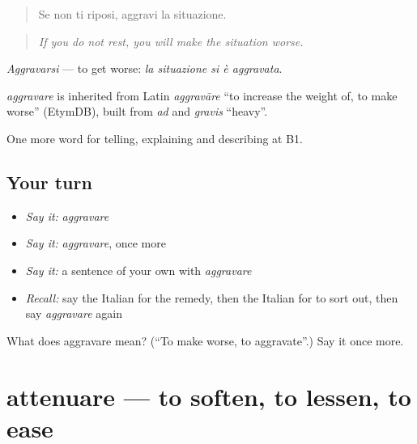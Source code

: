 \begin{quote}
Se non ti riposi, aggravi la situazione.
\end{quote}

\begin{quote}
\emph{If you do not rest, you will make the situation worse.}
\end{quote}

\emph{Aggravarsi} — to get worse: \emph{la situazione si è aggravata}.

\begin{cousinweb}
\emph{aggravare} is inherited from Latin \emph{aggravāre} \textquotedblleft{}to increase the weight of, to make worse\textquotedblright{} (EtymDB), built from \emph{ad} and \emph{gravis} \textquotedblleft{}heavy\textquotedblright{}.
\end{cousinweb}

\begin{grammarlens}[title={What you've built}]
One more word for telling, explaining and describing at B1.
\end{grammarlens}

\subsection*{Your turn}
\begin{itemize}
\raggedright
  \item \emph{Say it:} \emph{aggravare}
  \item \emph{Say it:} \emph{aggravare}, once more
  \item \emph{Say it:} a sentence of your own with \emph{aggravare}
  \item \emph{Recall:} say the Italian for the remedy, then the Italian for to sort out, then say \emph{aggravare} again
\end{itemize}

\begin{tcolorbox}[breakable,colback=teal!4,colframe=teal!35!black,title={Before you move on}]
What does aggravare mean? (\textquotedblleft{}To make worse, to aggravate\textquotedblright{}.) Say it once more.
\end{tcolorbox}
\section[attenuare]{attenuare — to soften, to lessen, to ease}

\label{lesson:IT-C355-attenuare}



